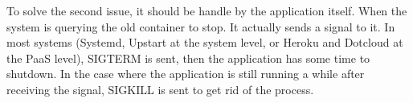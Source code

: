 To solve the second issue, it should be handle by the application itself. When
the system is querying the old container to stop. It actually sends a signal to
it.  In most systems (Systemd, Upstart at the system level, or Heroku and
Dotcloud at the PaaS level), SIGTERM is sent, then the application has some
time to shutdown. In the case where the application is still running a while
after receiving the signal, SIGKILL is sent to get rid of the process.
